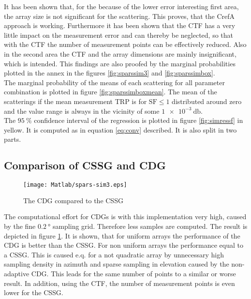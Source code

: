It has been shown that, for the because of the lower error interesting first area, the array size is not significant for the scattering. This proves, that the \ac{CrefA} approach is working. Furthermore it has been shown that the \ac{CTF} has a very little impact on the measurement error and can thereby be neglected, so that with the \ac{CTF} the number of measurement points can be effectively reduced. Also in the second area the \ac{CTF} and the array dimensions are mainly insignificant, which is intended. This findings are also proofed by the marginal probabilities plotted in the annex in the figures \ref{fig:sparssim3} and \ref{fig:sparssimbox}.\\
The marginal probability of the means of each scattering for all parameter combination is plotted in figure \ref{fig:sparssimboxmean}. The mean of the scatterings if the mean measurement \ac{TRP} is for $\text{SF} \le 1$ distributed around zero and the value range is always in the vicinity of some $\SI{1e-3}{\decibel}$.\\
The $\SI{95}{\percent}$ confidence interval of the regression is plotted in figure \ref{fig:simressf} in yellow. It is computed as in equation \ref{eq:conv} described. It is also split in two parts.

\subsection{Comparison of CSSG and CDG}

\begin{figure}[h]
\centering
\texttt{[image: Matlab/spars-sim3.eps]}
\caption{The CDG compared to the CSSG}
\label{fig:cdg}
\end{figure}

The computational effort for \acp{CDG} is with this implementation very high, caused by the fine $\SI{0.2}{\degree}$ sampling grid. Therefore less samples are computed. The result is depicted in figure \ref{fig:cdg}. It is shown, that for uniform arrays the performance of the \ac{CDG} is better than the \ac{CSSG}. For non uniform arrays the performance equal to a \ac{CSSG}. This is caused e.q. for a not quadratic array by unnecessary high sampling density in azimuth and sparse sampling in elevation caused by the non-adaptive \ac{CDG}. This leads for the same number of points to a similar or worse result. In addition, using the \ac{CTF}, the number of measurement points is even lower for the \ac{CSSG}.



